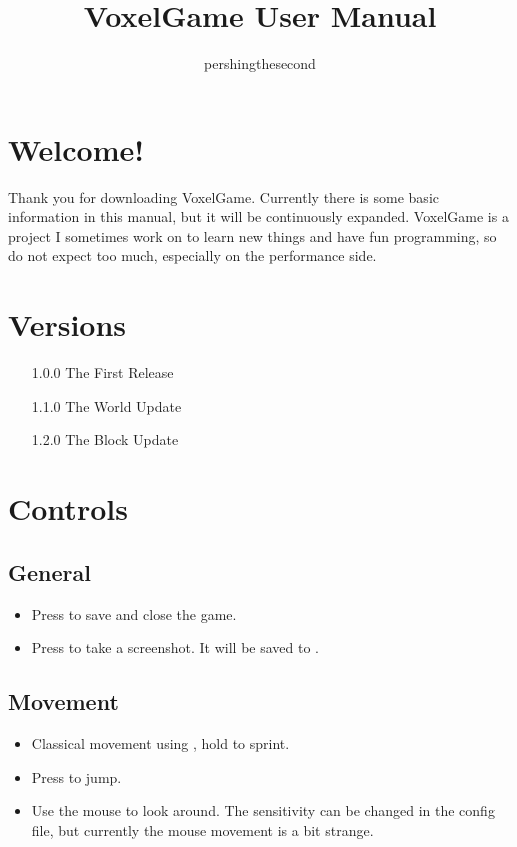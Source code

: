 \documentclass{article}
\begin{document}
    \title{VoxelGame User Manual}
    \author{pershingthesecond}

    \maketitle
    \newpage

    \tableofcontents
    \newpage


    \section{Welcome!}\label{sec:welcome!}

    Thank you for downloading VoxelGame.
    Currently there is some basic information in this manual, but it will be continuously expanded.
    VoxelGame is a project I sometimes work on to learn new things and have fun programming, so do not expect too much, especially on the performance side.


    \section{Versions}\label{sec:versions}

    \begin{enumerate}
        \item[1.0.0] The First Release
        \item[1.1.0] The World Update
        \item[1.2.0] The Block Update
    \end{enumerate}


    \section{Controls}\label{sec:controls}

    \subsection{General}\label{subsec:general}
    \begin{itemize}
        \item Press \keys{\esc} to save and close the game.
        \item Press  to take a screenshot.
        It will be saved to .
    \end{itemize}

    \subsection{Movement}\label{subsec:movement}
    \begin{itemize}
        \item Classical movement using , hold \keys{\shift} to sprint.
        \item Press \keys{\SPACE} to jump.
        \item Use the mouse to look around.
        The sensitivity can be changed in the config file, but currently the mouse movement is a bit strange.
    \end{itemize}
\end{document}
